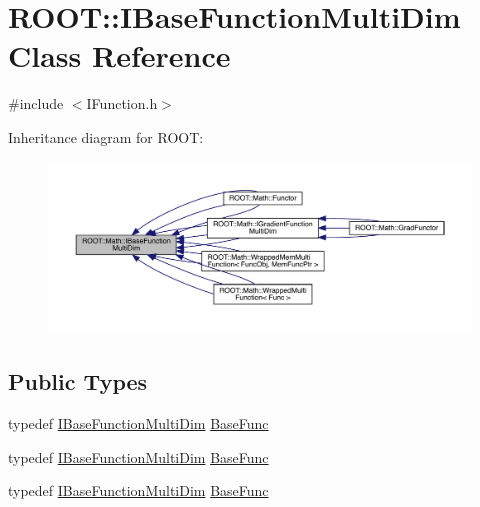 \hypertarget{classROOT_1_1Math_1_1IBaseFunctionMultiDim}{}\section{R\+O\+OT\+:\+:I\+Base\+Function\+Multi\+Dim Class Reference}
\label{classROOT_1_1Math_1_1IBaseFunctionMultiDim}


{\ttfamily \#include $<$I\+Function.\+h$>$}



Inheritance diagram for R\+O\+OT\+:
\nopagebreak
\begin{figure}[H]
\begin{center}
\leavevmode
\includegraphics[width=350pt]{d1/d72/classROOT_1_1Math_1_1IBaseFunctionMultiDim__inherit__graph}
\end{center}
\end{figure}
\subsection*{Public Types}
\begin{DoxyCompactItemize}
\item 
typedef \mbox{\hyperlink{classROOT_1_1Math_1_1IBaseFunctionMultiDim}{I\+Base\+Function\+Multi\+Dim}} \mbox{\hyperlink{classROOT_1_1Math_1_1IBaseFunctionMultiDim_a44c87c3e8c23d140cc3bf067d6480070}{Base\+Func}}
\item 
typedef \mbox{\hyperlink{classROOT_1_1Math_1_1IBaseFunctionMultiDim}{I\+Base\+Function\+Multi\+Dim}} \mbox{\hyperlink{classROOT_1_1Math_1_1IBaseFunctionMultiDim_a44c87c3e8c23d140cc3bf067d6480070}{Base\+Func}}
\item 
typedef \mbox{\hyperlink{classROOT_1_1Math_1_1IBaseFunctionMultiDim}{I\+Base\+Function\+Multi\+Dim}} \mbox{\hyperlink{classROOT_1_1Math_1_1IBaseFunctionMultiDim_a44c87c3e8c23d140cc3bf067d6480070}{Base\+Func}}
\end{DoxyCompactItemize}
